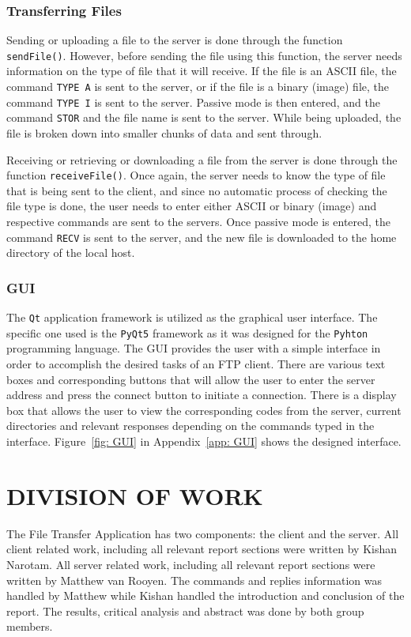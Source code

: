 \documentclass[10pt, conference]{IEEEtran}
\def\code#1{\texttt{#1}}
\begin{document}
\subsubsection{Transferring Files}
\label{sec: Transferring Files}
Sending or uploading a file to the server is done through the function \code{sendFile()}. However, before sending the file using this function, the server needs information on the type of file that it will receive. If the file is an ASCII file, the command \code{TYPE A} is sent to the server, or if the file is a binary (image) file, the command \code{TYPE I} is sent to the server. Passive mode is then entered, and the command \code{STOR} and the file name is sent to the server. While being uploaded, the file is broken down into smaller chunks of data and sent through.

Receiving or retrieving or downloading a file from the server is done through the function \code{receiveFile()}. Once again, the server needs to know the type of file that is being sent to the client, and since no automatic process of checking the file type is done, the user needs to enter either ASCII or binary (image) and respective commands are sent to the servers. Once passive mode is entered, the command \code{RECV} is sent to the server, and the new file is downloaded to the home directory of the local host.

\subsubsection{GUI}
\label{sec: GUI}
The \code{Qt} application framework is utilized as the graphical user interface. The specific one used is the \code{PyQt5} framework as it was designed for the \code{Pyhton} programming language. The GUI provides the user with a simple interface in order to accomplish the desired tasks of an FTP client. There are various text boxes and corresponding buttons that will allow the user to enter the server address and press the connect button to initiate a connection. There is a display box that allows the user to view the corresponding codes from the server, current directories and relevant responses depending on the commands typed in the interface. Figure~\ref{fig: GUI} in Appendix~\ref{app: GUI} shows the designed interface.

%
\section{DIVISION OF WORK}
\label{sec: Division of Work}
The File Transfer Application has two components: the client and the server. All client related work, including all relevant report sections were written by Kishan Narotam. All server related work, including all relevant report sections were written by Matthew van Rooyen. The commands and replies information was handled by Matthew while Kishan handled the introduction and conclusion of the report. The results, critical analysis and abstract was done by both group members.
\end{document}

